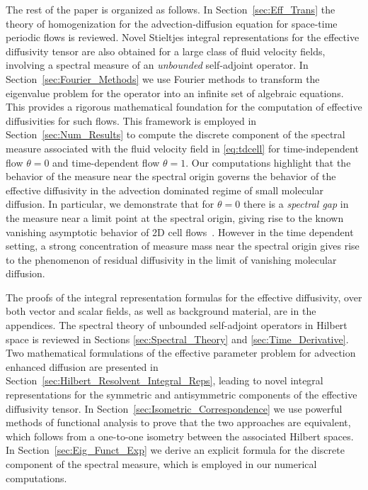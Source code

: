 \documentclass[leqno,onefignum,onetabnum]{siamltex1213}
\newcommand{\secref}[1]{Section~\ref{#1}}
\begin{document}
The rest of the paper is organized as follows. In
\secref{sec:Eff_Trans} the theory of homogenization for the
advection-diffusion equation for space-time periodic flows is
reviewed. Novel Stieltjes integral representations for the effective
diffusivity tensor are also obtained for a large class of fluid
velocity fields, involving a spectral measure of an \emph{unbounded}
self-adjoint operator. In \secref{sec:Fourier_Methods} we use Fourier
methods to transform the eigenvalue problem for the operator into an
infinite set of algebraic equations. This provides a rigorous
mathematical foundation for the computation of effective diffusivities
for such flows. This framework is employed in \secref{sec:Num_Results}
to compute the discrete component of the spectral measure associated
with the fluid velocity field in \eqref{eq:tdcell} for time-independent
flow $\theta=0$ and time-dependent flow $\theta=1$. Our computations highlight
that the behavior of the measure near the spectral origin governs the
behavior of the effective diffusivity in the advection dominated
regime of small molecular diffusion. In particular, we demonstrate
that for $\theta=0$ there is a \emph{spectral gap} in the measure near a
limit point at the spectral origin, giving rise to the known vanishing
asymptotic behavior of 2D cell
flows~\cite{Fannjiang:1994:SIAM_JAM:333,Novikov:2005:CPAM:867}. However in the time
dependent setting, a strong concentration of measure mass near the
spectral origin gives rise to the phenomenon of residual diffusivity
in the limit of vanishing molecular diffusion.


The proofs of the integral  representation formulas for the  effective
diffusivity, over both vector and scalar fields, as well as background
material, are in the appendices. The spectral theory of unbounded self-adjoint
operators in Hilbert space is reviewed in Sections
\ref{sec:Spectral_Theory} and \ref{sec:Time_Derivative}. Two
mathematical formulations of the effective parameter problem for
advection enhanced diffusion are presented in
\secref{sec:Hilbert_Resolvent_Integral_Reps}, leading to novel
integral representations for the symmetric and antisymmetric
components of the effective diffusivity tensor. In
\secref{sec:Isometric_Correspondence} we use powerful methods of
functional analysis to prove that the two approaches are equivalent,
which follows from a one-to-one isometry between the associated
Hilbert spaces. In \secref{sec:Eig_Funct_Exp} we derive an explicit
formula for the discrete component of the spectral measure, which is
employed in our numerical computations.
\end{document}
